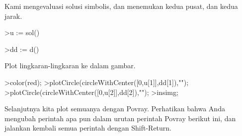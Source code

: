 \documentclass[12pt,Times new roman,letterpaper]{book}
\begin{document}
\begin{eulernootebook}
\begin{eulercomment}
\begin{eulercomment}
\begin{eulernootebook}
\begin{eulercomment}
\begin{eulercomment}
\begin{eulercomment}
\begin{eulercomment}
\begin{eulercomment}
\begin{eulercomment}
\begin{eulernotebook}
\begin{eulercomment}
\begin{eulercomment}
\begin{eulercomment}
\begin{eulercomment}
\begin{eulercomment}
\begin{eulercomment}
Kami mengevaluasi solusi simbolis, dan menemukan kedua pusat, dan
kedua jarak.
\end{eulercomment}
\begin{eulerprompt}
>u := sol()
\end{eulerprompt}
\begin{euleroutput}
  [0.333333,  1]
\end{euleroutput}
\begin{eulerprompt}
>dd := d()
\end{eulerprompt}
\begin{euleroutput}
  [0.149071,  0.447214]
\end{euleroutput}
\begin{eulercomment}
Plot lingkaran-lingkaran ke dalam gambar.
\end{eulercomment}
\begin{eulerprompt}
>color(red);
>plotCircle(circleWithCenter([0,u[1]],dd[1]),"");
>plotCircle(circleWithCenter([0,u[2]],dd[2]),"");
>insimg;
\end{eulerprompt}
\begin{eulercomment}
Selanjutnya kita plot semuanya dengan Povray. Perhatikan bahwa Anda
mengubah perintah apa pun dalam urutan perintah Povray berikut ini,
dan jalankan kembali semua perintah dengan Shift-Return.


\end{eulercomment}
\end{eulercomment}
\end{eulercomment}
\end{eulercomment}
\end{eulercomment}
\end{eulercomment}
\end{eulernotebook}
\end{eulercomment}
\end{eulercomment}
\end{eulercomment}
\end{eulercomment}
\end{eulercomment}
\end{eulercomment}
\end{eulernootebook}
\end{eulercomment}
\end{eulercomment}
\end{eulernootebook}
\end{document}
